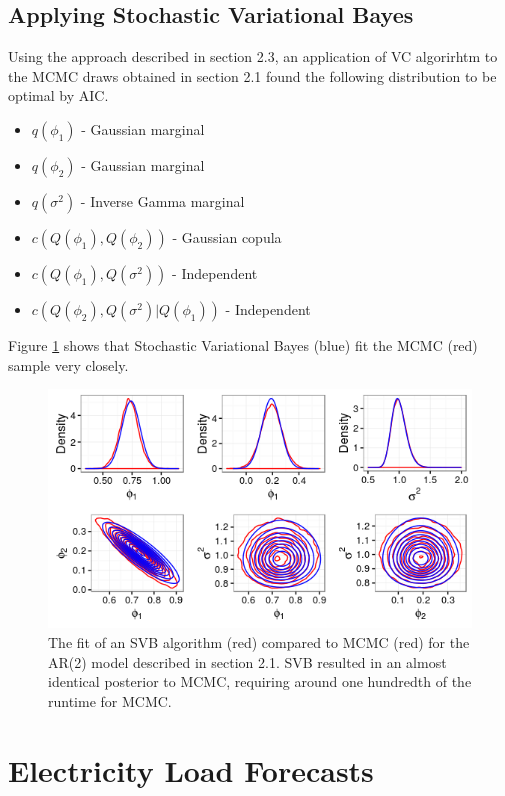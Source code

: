 \documentclass[12pt,a4paper]{article}%
\numberwithin{equation}{section}
\begin{document}
\subsection{Applying Stochastic Variational Bayes}

Using the approach described in section 2.3, an application of VC algorirhtm to the MCMC draws obtained in section 2.1 found the following distribution to be optimal by AIC.

\begin{itemize}
\item $q(\phi_1)$ - Gaussian marginal
\item $q(\phi_2)$ - Gaussian marginal
\item $q(\sigma^2)$ - Inverse Gamma marginal
\item $c(Q(\phi_1), Q(\phi_2))$ - Gaussian copula
\item $c(Q(\phi_1), Q(\sigma^2))$ - Independent
\item $c(Q(\phi_2), Q(\sigma^2) | Q(\phi_1))$ - Independent
\end{itemize}

Figure \ref{VBfit} shows that Stochastic Variational Bayes (blue) fit the MCMC (red) sample very closely.

\begin{figure}[h]
\centering
\includegraphics[scale = 0.5]{VBfit.png}
\caption{The fit of an SVB algorithm (red) compared to MCMC (red) for the AR(2) model described in section 2.1. SVB resulted in an almost identical posterior to MCMC, requiring around one hundredth of the runtime for MCMC.}
\label{VBfit}
\end{figure}

\section{Electricity Load Forecasts}
\end{document}
